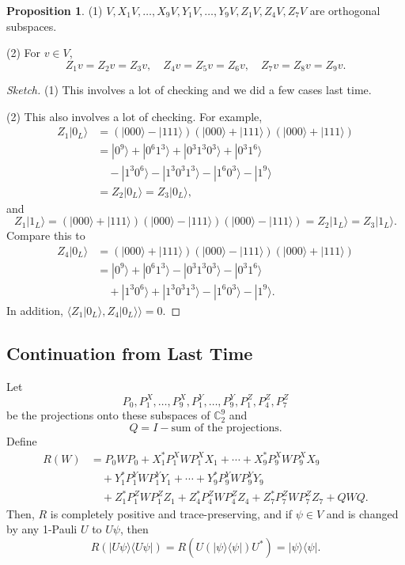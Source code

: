\documentclass[12pt]{article}
\theoremstyle{definition}
\newtheorem*{proposition}{Proposition}
\newcommand{\C}{\mathbb{C}}
\begin{document}
\begin{proposition}
(1) $V, X_1V,\ldots,X_9V, Y_1V,\ldots,Y_9V, Z_1V, Z_4V, Z_7V$ are orthogonal subspaces.

(2) For $v \in V$,
\[
Z_1v=Z_2v=Z_3v, \quad Z_4v=Z_5v=Z_6v, \quad Z_7v=Z_8v=Z_9v.
\]
\end{proposition}

\begin{proof}[Sketch]
(1) This involves a lot of checking and we did a few cases last time.

(2) This also involves a lot of checking. For example,
\begin{align*}
Z_1|0_L\rangle &= (|000\rangle-|111\rangle)(|000\rangle+|111\rangle)(|000\rangle+|111\rangle) \\
&= |0^9\rangle + |0^6 1^3\rangle + |0^3 1^3 0^3\rangle + |0^3 1^6\rangle \\
&\quad - |1^3 0^6\rangle - |1^3 0^3 1^3\rangle - |1^6 0^3\rangle - |1^9\rangle \\
&= Z_2|0_L\rangle = Z_3|0_L\rangle,
\end{align*}
and
\[
Z_1|1_L\rangle = (|000\rangle+|111\rangle)(|000\rangle-|111\rangle)(|000\rangle-|111\rangle) = Z_2|1_L\rangle = Z_3|1_L\rangle.
\]
Compare this to
\begin{align*}
Z_4|0_L\rangle &= (|000\rangle+|111\rangle)(|000\rangle-|111\rangle)(|000\rangle+|111\rangle) \\
&= |0^9\rangle + |0^6 1^3\rangle - |0^3 1^3 0^3\rangle - |0^3 1^6\rangle \\
&\quad + |1^3 0^6\rangle + |1^3 0^3 1^3\rangle - |1^6 0^3\rangle - |1^9\rangle.
\end{align*}
In addition, $\langle Z_1|0_L\rangle, Z_4|0_L\rangle\rangle = 0$.
\end{proof}

\subsection{Continuation from Last Time}

Let
\[
P_0,P_1^X,\ldots,P_9^X,P_1^Y,\ldots,P_9^Y,P_1^Z,P_4^Z,P_7^Z
\]
be the projections onto these subspaces of $\C_2^9$ and
\[
Q = I - \text{sum of the projections}.
\]
Define
\begin{align*}
R(W) &= P_0WP_0 + X_1^*P_1^XWP_1^XX_1 + \cdots + X_9^*P_9^XWP_9^XX_9 \\
&\quad + Y_1^*P_1^YWP_1^YY_1 + \cdots + Y_9^*P_9^YWP_9^YY_9 \\
&\quad + Z_1^*P_1^ZWP_1^ZZ_1 + Z_4^*P_4^ZWP_4^ZZ_4 + Z_7^*P_7^ZWP_7^ZZ_7 + QWQ.
\end{align*}
Then, $R$ is completely positive and trace-preserving, and if $\psi \in V$ and is changed by any 1-Pauli $U$ to $U\psi$, then
\[
R(|U\psi\rangle\langle U\psi|)=R(U(|\psi\rangle\langle \psi|)U^*)=|\psi\rangle\langle \psi|.
\]
\end{document}
